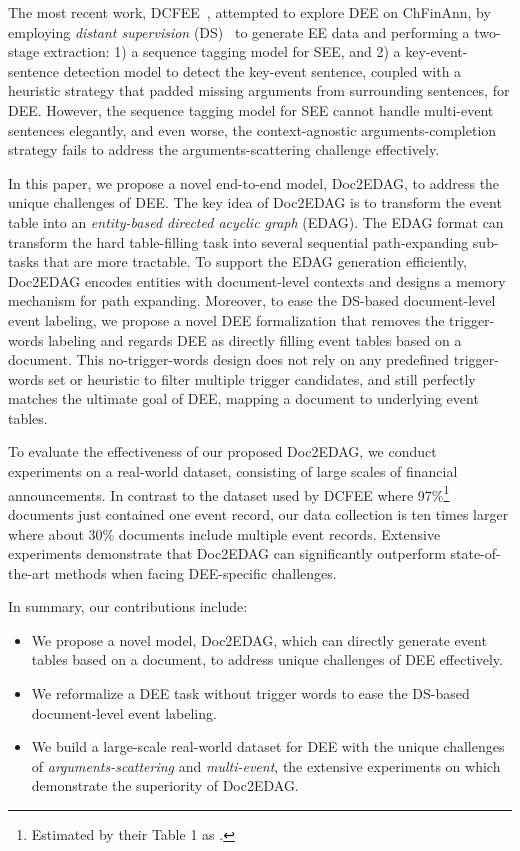 \documentclass[11pt,a4paper]{article}
\begin{document}
The most recent work, DCFEE~\cite{yang2018dcfee}, attempted to explore DEE on ChFinAnn, by employing \textit{distant supervision} (DS)~\cite{mintz2009distant} to generate EE data and performing a two-stage extraction: 1) a sequence tagging model for SEE, and 2) a key-event-sentence detection model to detect the key-event sentence, coupled with a heuristic strategy that padded missing arguments from surrounding sentences, for DEE.
However, the sequence tagging model for SEE cannot handle multi-event sentences elegantly, and even worse, the context-agnostic arguments-completion strategy fails to address the arguments-scattering challenge effectively.

In this paper, we propose a novel end-to-end model, Doc2EDAG, to address the unique challenges of DEE.
The key idea of Doc2EDAG is to transform the event table into an \textit{entity-based directed acyclic graph} (EDAG).
The EDAG format can transform the hard table-filling task into several sequential path-expanding sub-tasks that are more tractable.
To support the EDAG generation efficiently, Doc2EDAG encodes entities with document-level contexts and designs a memory mechanism for path expanding.
Moreover, to ease the DS-based document-level event labeling,
we propose a novel DEE formalization that removes the trigger-words labeling and regards DEE as directly filling event tables based on a document.
This no-trigger-words design does not rely on any predefined trigger-words set or heuristic to filter multiple trigger candidates, and still perfectly matches the ultimate goal of DEE, mapping a document to underlying event tables.

To evaluate the effectiveness of our proposed Doc2EDAG, we conduct experiments on a real-world dataset, consisting of large scales of financial announcements. In contrast to the dataset used by DCFEE where
97\%\footnote{Estimated by their Table 1 as .}
documents just contained one event record,
our data collection is ten times larger where about 30\% documents include multiple event records. 
Extensive experiments demonstrate that Doc2EDAG can significantly outperform state-of-the-art methods when facing DEE-specific challenges.


In summary, our contributions include:
\begin{itemize}
    \item We propose a novel model, Doc2EDAG, which can directly generate event tables based on a document, to address unique challenges of DEE effectively.
    \item We reformalize a DEE task without trigger words to ease the DS-based document-level event labeling.
    \item We build a large-scale real-world dataset for DEE with the unique challenges of \textit{arguments-scattering} and \textit{multi-event}, the extensive experiments on which demonstrate the superiority of Doc2EDAG.
\end{itemize}
\end{document}
